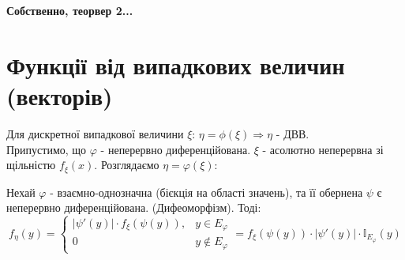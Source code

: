 

\begin{center}
	\Huge \textbf{Собственно, теорвер 2...}
\end{center}
\section{Функції від випадкових величин (векторів)}
Для дискретної випадкової величини $\xi$: $\eta = \phi (\xi) \Rightarrow \eta$ - ДВВ. \\
Припустимо, що $\varphi$ - неперервно диференційована. $\xi$ - асолютно неперервна зі щільністю $f_{\xi}(x)$. Розглядаємо $ \eta = \varphi(\xi) $:

\begin{boxteo}
    Нехай $\varphi$ - взаємно-однозначна (бієкція на області значень), та її обернена $\psi$ є неперервно диференційована. (Дифеоморфізм). Тоді:
    $$
    f_{\eta} (y) = \begin{cases}
    \left| \psi '(y) \right| \cdot  f_{\xi }(\psi (y)), & y \in E_{\varphi}\\
        0 & y \notin E_{\varphi}
    \end{cases} = f_{\xi} (\psi (y)) \cdot \left| \psi'(y) \right| \cdot \mathbb{I}_{E_{\varphi}}(y)
    $$
\end{boxteo}

